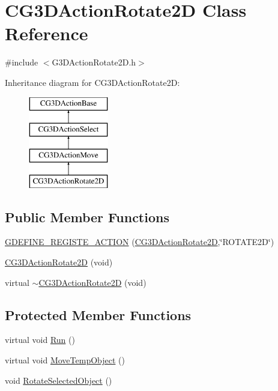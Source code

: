 \hypertarget{class_c_g3_d_action_rotate2_d}{}\section{C\+G3\+D\+Action\+Rotate2\+D Class Reference}
\label{class_c_g3_d_action_rotate2_d}


{\ttfamily \#include $<$G3\+D\+Action\+Rotate2\+D.\+h$>$}

Inheritance diagram for C\+G3\+D\+Action\+Rotate2\+D\+:\begin{figure}[H]
\begin{center}
\leavevmode
\includegraphics[height=4.000000cm]{class_c_g3_d_action_rotate2_d}
\end{center}
\end{figure}
\subsection*{Public Member Functions}
\begin{DoxyCompactItemize}
\item 
\hyperlink{class_c_g3_d_action_rotate2_d_ad2616b611c304096136c591ff56daddf}{G\+D\+E\+F\+I\+N\+E\+\_\+\+R\+E\+G\+I\+S\+T\+E\+\_\+\+A\+C\+T\+I\+O\+N} (\hyperlink{class_c_g3_d_action_rotate2_d}{C\+G3\+D\+Action\+Rotate2\+D},\char`\"{}R\+O\+T\+A\+T\+E2\+D\char`\"{})
\item 
\hyperlink{class_c_g3_d_action_rotate2_d_a28cbd925ce8af54b067e2d6a96b9d8b1}{C\+G3\+D\+Action\+Rotate2\+D} (void)
\item 
virtual \hyperlink{class_c_g3_d_action_rotate2_d_a159c1d0b68d200e2db07d2b27e88d6dd}{$\sim$\+C\+G3\+D\+Action\+Rotate2\+D} (void)
\end{DoxyCompactItemize}
\subsection*{Protected Member Functions}
\begin{DoxyCompactItemize}
\item 
virtual void \hyperlink{class_c_g3_d_action_rotate2_d_a5d358d4ec96dade0d5abefbe0ad346fa}{Run} ()
\item 
virtual void \hyperlink{class_c_g3_d_action_rotate2_d_ad6a47a3b986c7328124bf9e1b9142b31}{Move\+Temp\+Object} ()
\item 
void \hyperlink{class_c_g3_d_action_rotate2_d_abdcf2fa557a5af3fc81beec5fb60d42a}{Rotate\+Selected\+Object} ()
\end{DoxyCompactItemize}
